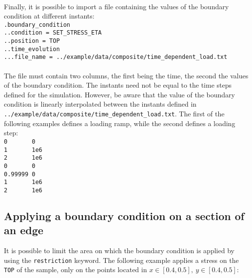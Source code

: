 \documentclass[10pt]{article}
\begin{document}
\paragraph{}Finally, it is possible to import a file containing the values of the boundary condition at different instants:\\

\noindent \verb+.boundary_condition+\\
\verb+..condition = SET_STRESS_ETA+\\
\verb+..position = TOP+\\
\verb+..time_evolution+\\
\verb+...file_name = ../example/data/composite/time_dependent_load.txt+

\paragraph{}The file must contain two columns, the first being the time, the second the values of the boundary condition. The instants need not be equal to the time steps defined for the simulation. However, be aware that the value of the boundary condition is linearly interpolated between the instants defined in \verb+../example/data/composite/time_dependent_load.txt+. The first of the following examples defines a loading ramp, while the second defines a loading step:\\

\noindent \verb+0       0+\\
\verb+1       1e6+\\
\verb+2       1e6+\\

\noindent \verb+0       0+\\
\verb+0.99999 0+\\
\verb+1       1e6+\\
\verb+2       1e6+\\

\subsection{Applying a boundary condition on a section of an edge}

It is possible to limit the area on which the boundary condition is applied by using the \verb+restriction+ keyword. The following example applies a stress on the \verb+TOP+ of the sample, only on the points located in $x \in \left[0.4,0.5\right],\ y \in \left[0.4,0.5\right]$:\\
\end{document}
